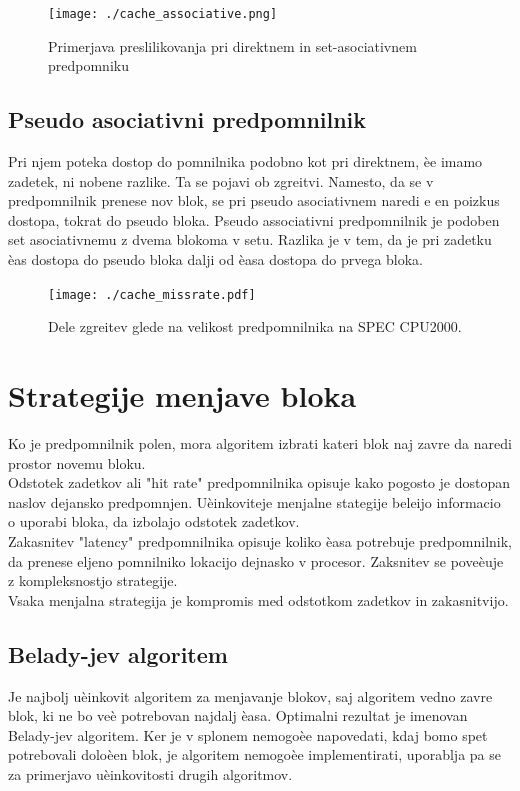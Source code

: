 \documentclass[12pt,a4paper,openany]{book}
\begin{document}
\begin{figure}[htb]
 \centering
 \texttt{[image: ./cache\_associative.png]}
 \caption[Primerjava preslilikovanja]{Primerjava preslilikovanja pri direktnem in set-asociativnem predpomniku}
 \label{slika_primerjava}
\end{figure}

\subsection{Pseudo asociativni predpomnilnik}
Pri njem poteka dostop do pomnilnika podobno kot pri direktnem, èe imamo zadetek, ni nobene razlike. Ta se pojavi ob zgreitvi. Namesto, da se v predpomnilnik prenese nov blok, se pri pseudo asociativnem naredi e en poizkus dostopa, tokrat do pseudo bloka.
Pseudo associativni predpomnilnik je podoben set asociativnemu z dvema blokoma v setu. Razlika je v tem, da je pri zadetku èas dostopa
do pseudo bloka dalji od èasa dostopa do prvega bloka.

\begin{figure}[htb]
 \centering
 \texttt{[image: ./cache\_missrate.pdf]}
 \caption[Dele zgreitev glede na velikost predpomnilnika]{Dele zgreitev glede na velikost predpomnilnika na SPEC CPU2000.}
 \label{slika_missrate}
\end{figure}


\label{strategija_menjave}
\section{Strategije menjave bloka}
Ko je predpomnilnik polen, mora algoritem izbrati kateri blok naj zavre da naredi prostor novemu bloku.\\
Odstotek zadetkov ali "hit rate" predpomnilnika opisuje kako pogosto je dostopan naslov dejansko predpomnjen. Uèinkoviteje menjalne
stategije beleijo informacio o uporabi bloka, da izbolajo odstotek zadetkov.\\
Zakasnitev "latency" predpomnilnika opisuje koliko èasa potrebuje predpomnilnik, da prenese eljeno pomnilniko lokacijo dejnasko v
procesor. Zaksnitev se poveèuje z kompleksnostjo strategije.\\
Vsaka menjalna strategija je kompromis med odstotkom zadetkov in zakasnitvijo.

\subsection{Belady-jev algoritem}
Je najbolj uèinkovit algoritem za menjavanje blokov, saj algoritem vedno zavre blok, ki ne bo veè potrebovan najdalj èasa. Optimalni
rezultat je imenovan Belady-jev algoritem. Ker je v splonem nemogoèe napovedati, kdaj bomo spet potrebovali doloèen blok, je algoritem nemogoèe implementirati, uporablja pa se za primerjavo uèinkovitosti drugih algoritmov.
\end{document}
